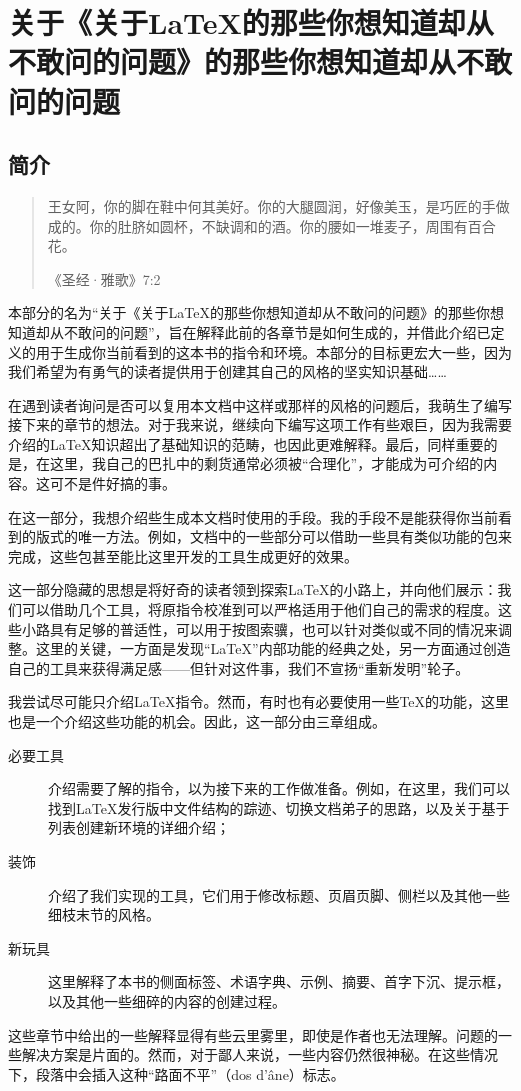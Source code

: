 \part{关于《关于\LaTeX 的那些你想知道却从不敢问的问题》的那些你想知道却从不敢问的问题}

\chapter*{简介}

\begin{quote}
    王女阿，你的脚在鞋中何其美好。你的大腿圆润，好像美玉，是巧匠的手做成的。你的肚脐如圆杯，不缺调和的酒。你的腰如一堆麦子，周围有百合花。

    \hfill《圣经·雅歌》7:2
\end{quote}

本部分的名为“关于《关于\LaTeX 的那些你想知道却从不敢问的问题》的那些你想知道却从不敢问的问题”，旨在解释此前的各章节是如何生成的，并借此介绍已定义的用于生成你当前看到的这本书的指令和环境。本部分的目标更宏大一些，因为我们希望为有勇气的读者提供用于创建其自己的风格的坚实知识基础……

在遇到读者询问是否可以复用本文档中这样或那样的风格的问题后，我萌生了编写接下来的章节的想法。对于我来说，继续向下编写这项工作有些艰巨，因为我需要介绍的\LaTeX 知识超出了基础知识的范畴，也因此更难解释。最后，同样重要的是，在这里，我自己的巴扎中的剩货通常必须被“合理化”，才能成为可介绍的内容。这可不是件好搞的事。

在这一部分，我想介绍些生成本文档时使用的手段。我的手段不是能获得你当前看到的版式的唯一方法。例如，文档中的一些部分可以借助一些具有类似功能的包来完成，这些包甚至能比这里开发的工具生成更好的效果。

这一部分隐藏的思想是将好奇的读者领到探索\LaTeX 的小路上，并向他们展示：我们可以借助几个工具，将原指令校准到可以严格适用于他们自己的需求的程度。这些小路具有足够的普适性，可以用于按图索骥，也可以针对类似或不同的情况来调整。这里的关键，一方面是发现“\LaTeX ”内部功能的经典之处，另一方面通过创造自己的工具来获得满足感——但针对这件事，我们不宣扬“重新发明”轮子。

我尝试尽可能只介绍\LaTeX 指令。然而，有时也有必要使用一些\TeX 的功能，这里也是一个介绍这些功能的机会。因此，这一部分由三章组成。

\begin{description}
    \item[必要工具] 介绍需要了解的指令，以为接下来的工作做准备。例如，在这里，我们可以找到\LaTeX 发行版中文件结构的踪迹、切换文档弟子的思路，以及关于基于列表创建新环境的详细介绍；
    \item[装饰] 介绍了我们实现的工具，它们用于修改标题、页眉页脚、侧栏以及其他一些细枝末节的风格。
    \item[新玩具] 这里解释了本书的侧面标签、术语字典、示例、摘要、首字下沉、提示框，以及其他一些细碎的内容的创建过程。
\end{description}

\begin{qquestion}
这些章节中给出的一些解释显得有些云里雾里，即使是作者也无法理解。问题的一些解决方案是片面的。然而，对于鄙人来说，一些内容仍然很神秘。在这些情况下，段落中会插入这种“路面不平”（dos d'âne）标志。
\end{qquestion}